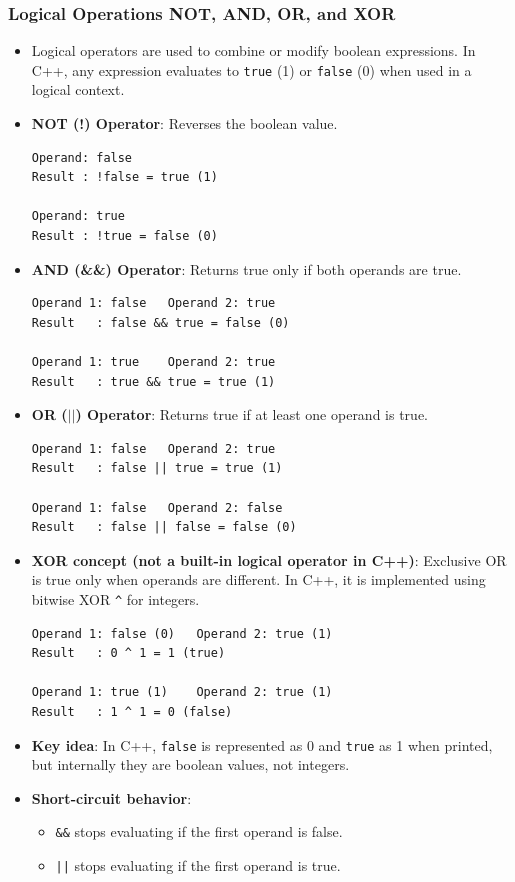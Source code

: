 \documentclass[10pt]{article}
\begin{document}
\newpage

\subsubsection{Logical Operations NOT, AND, OR, and XOR}
\begin{itemize}
	\item Logical operators are used to combine or modify boolean expressions. In C++, any expression evaluates to \verb|true| (1) or \verb|false| (0) when used in a logical context.

	\item \textbf{NOT (!) Operator}: Reverses the boolean value.
	\begin{verbatim}
Operand: false
Result : !false = true (1)

Operand: true
Result : !true = false (0)
	\end{verbatim}

	\item \textbf{AND (\&\&) Operator}: Returns true only if both operands are true.
	\begin{verbatim}
Operand 1: false   Operand 2: true
Result   : false && true = false (0)

Operand 1: true    Operand 2: true
Result   : true && true = true (1)
	\end{verbatim}

	\item \textbf{OR ($||$) Operator}: Returns true if at least one operand is true.
	\begin{verbatim}
Operand 1: false   Operand 2: true
Result   : false || true = true (1)

Operand 1: false   Operand 2: false
Result   : false || false = false (0)
	\end{verbatim}

	\item \textbf{XOR concept (not a built-in logical operator in C++)}: Exclusive OR is true only when operands are different. In C++, it is implemented using bitwise XOR \verb|^| for integers.
	\begin{verbatim}
Operand 1: false (0)   Operand 2: true (1)
Result   : 0 ^ 1 = 1 (true)

Operand 1: true (1)    Operand 2: true (1)
Result   : 1 ^ 1 = 0 (false)
	\end{verbatim}

	\item \textbf{Key idea}: In C++, \verb|false| is represented as 0 and \verb|true| as 1 when printed, but internally they are boolean values, not integers.

	\item \textbf{Short-circuit behavior}:
	\begin{itemize}
		\item \verb|&&| stops evaluating if the first operand is false.
		\item \verb+||+ stops evaluating if the first operand is true.
	\end{itemize}
\end{itemize}
\end{document}
